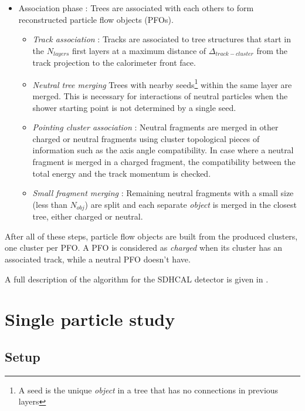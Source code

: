 \documentclass[cits]{JINST}
\begin{document}
\begin{itemize}
  \item[\textbullet] Association phase : Trees are associated with each others to form reconstructed particle flow objects (PFOs).
  \begin{itemize}
    \item \emph{Track association} : Tracks are associated to tree structures that start in the $N_{layers}$ first layers at a maximum distance of $\Delta_{track-cluster}$ from the track projection to the calorimeter front face. 
    \item \emph{Neutral tree merging} Trees with nearby seeds\footnote{A seed is the unique \emph{object} in a tree that has no connections in previous layers} within the same layer are merged. This is necessary for interactions of neutral particles when the shower starting point is not determined by a single seed.
    \item \emph{Pointing cluster association} : Neutral fragments are merged in other charged or neutral fragments using cluster topological pieces of information such as the axis angle  compatibility. In case where a neutral fragment is merged in a charged fragment, the compatibility between the total energy and the track momentum is checked.
    \item \emph{Small fragment merging} : Remaining neutral fragments with a small size (less than $N_{obj}$) are split and each separate \emph{object} is merged in the closest tree, either charged or neutral.
  \end{itemize}
\end{itemize}

After all of these steps, particle flow objects are built from the produced clusters, one cluster per PFO. A PFO is considered as \emph{charged} when its cluster has an associated track, while a neutral PFO doesn't have.

A full description of the algorithm for the SDHCAL detector is given in \cite{arborpfa-can}.

\newpage
\section{Single particle study}
\label{SINGLE_PARTICLE_STUDY_SECTION}

\subsection{Setup}
\end{document}
